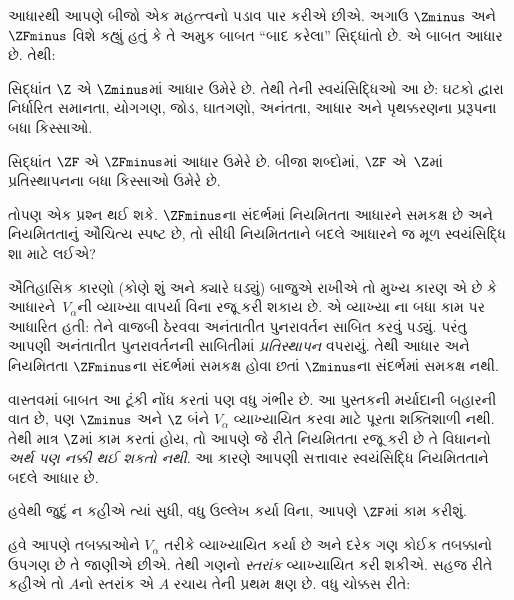 \begingroup
\makeatletter{}\makeatother

\label{guunit:OLP-0563}


આધારથી આપણે બીજો એક મહત્ત્વનો પડાવ પાર કરીએ છીએ. અગાઉ
$\Zminus$ અને $\ZFminus$ વિશે કહ્યું હતું કે તે
અમુક બાબત ``બાદ કરેલા'' સિદ્ધાંતો છે. એ બાબત આધાર છે. તેથી:

\begin{defn}
સિદ્ધાંત $\Z$ એ $\Zminus$માં આધાર ઉમેરે છે. તેથી તેની
સ્વયંસિદ્ધિઓ આ છે: ઘટકો દ્વારા નિર્ધારિત સમાનતા, યોગગણ, જોડ,
ઘાતગણો, અનંતતા, આધાર અને પૃથક્કરણના પ્રરૂપના બધા કિસ્સાઓ.

સિદ્ધાંત $\ZF$ એ $\ZFminus$માં આધાર ઉમેરે છે. બીજા શબ્દોમાં,
$\ZF$ એ~$\Z$માં પ્રતિસ્થાપનના બધા કિસ્સાઓ ઉમેરે છે.
\end{defn}

તોપણ એક પ્રશ્ન થઈ શકે. $\ZFminus$ના સંદર્ભમાં નિયમિતતા
આધારને સમકક્ષ છે અને નિયમિતતાનું ઔચિત્ય સ્પષ્ટ છે, તો સીધી
નિયમિતતાને બદલે આધારને જ મૂળ સ્વયંસિદ્ધિ શા માટે લઈએ?

ઐતિહાસિક કારણો (કોણે શું અને ક્યારે ઘડ્યું) બાજુએ રાખીએ તો
મુખ્ય કારણ એ છે કે આધારને~$V_\alpha$ની વ્યાખ્યા વાપર્યા વિના
રજૂ કરી શકાય છે. એ વ્યાખ્યા
ના બધા કામ પર આધારિત હતી: તેને
વાજબી ઠેરવવા અનંતાતીત પુનરાવર્તન સાબિત કરવું પડ્યું.
પરંતુ આપણી અનંતાતીત પુનરાવર્તનની સાબિતીમાં
\emph{પ્રતિસ્થાપન} વપરાયું. તેથી આધાર અને નિયમિતતા
$\ZFminus$ના સંદર્ભમાં સમકક્ષ હોવા છતાં $\Zminus$ના
સંદર્ભમાં સમકક્ષ નથી.

વાસ્તવમાં બાબત આ ટૂંકી નોંધ કરતાં પણ વધુ ગંભીર છે.
આ પુસ્તકની મર્યાદાની બહારની વાત છે, પણ $\Zminus$ અને
$\Z$ બંને $V_\alpha$ વ્યાખ્યાયિત કરવા માટે પૂરતા શક્તિશાળી
નથી. તેથી માત્ર $\Z$માં કામ કરતાં હોય, તો આપણે જે રીતે
નિયમિતતા રજૂ કરી છે તે વિધાનનો \emph{અર્થ પણ નક્કી થઈ શકતો નથી}.
આ કારણે આપણી સત્તાવાર સ્વયંસિદ્ધિ નિયમિતતાને બદલે આધાર છે.

હવેથી જુદું ન કહીએ ત્યાં સુધી, વધુ ઉલ્લેખ કર્યા વિના,
આપણે $\ZF$માં કામ કરીશું.
\endgroup

\begingroup
\makeatletter{}\makeatother

\label{guunit:OLP-0564}


હવે આપણે તબક્કાઓને $V_\alpha$ તરીકે વ્યાખ્યાયિત કર્યા છે અને
દરેક ગણ કોઈક તબક્કાનો ઉપગણ છે તે જાણીએ છીએ. તેથી ગણનો
\emph{સ્તરાંક} વ્યાખ્યાયિત કરી શકીએ. સહજ રીતે કહીએ તો
$A$નો સ્તરાંક એ $A$ રચાય તેની પ્રથમ ક્ષણ છે. વધુ ચોક્કસ રીતે:

